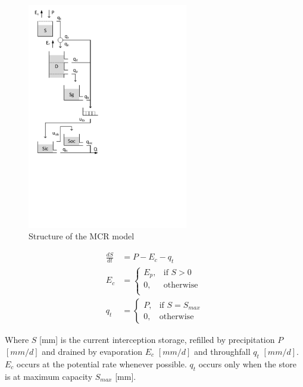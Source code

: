 { 																	%
\begin{figure}
\includegraphics[trim=1cm 10cm 7cm 1cm,width=7cm,keepaspectratio]{./AppA_files/39_schematic.pdf}
\caption{Structure of the MCR model} \label{fig:39_schematic}
\end{figure}

\begin{align}
	\frac{dS}{dt} &= P-E_c-q_t \\
	E_c &= \begin{cases}
		E_p, &\text{if } S > 0 \\
		0, & \text{otherwise} \\
	\end{cases} \\
	q_t &= 
	\begin{cases}
		P, & \text{if } S=S_{max} \\
		0, & \text{otherwise}
	\end{cases}
\end{align}

Where $S$ [mm] is the current interception storage, refilled by precipitation $P$ $[mm/d]$ and drained by evaporation $E_c$ $[mm/d]$ and throughfall $q_t$ $[mm/d]$.
$E_c$ occurs at the potential rate whenever possible.
$q_t$ occurs only when the store is at maximum capacity $S_{max}$ [mm].

}
